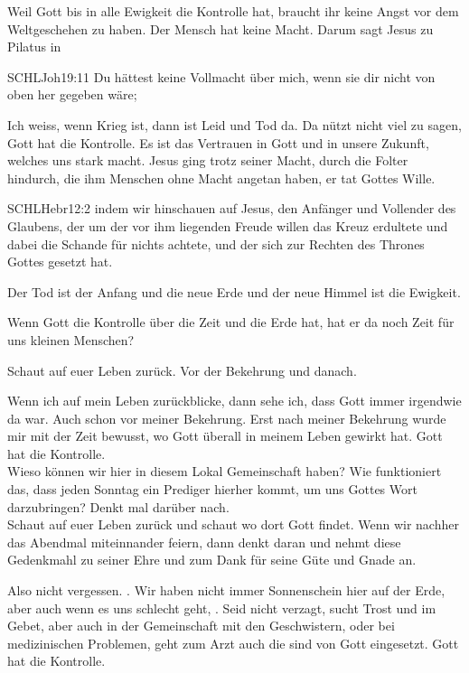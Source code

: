 \begin{otsblock}
        Weil Gott bis in alle Ewigkeit die Kontrolle hat, braucht ihr keine Angst vor dem Weltgeschehen zu haben. Der Mensch hat keine Macht. Darum sagt Jesus zu Pilatus in
        \begin{bibelbox}{SCHL}{Joh}{19:11}
            Du hättest keine Vollmacht über mich, wenn sie dir nicht von oben her gegeben wäre;
        \end{bibelbox}
        Ich weiss, wenn Krieg ist, dann ist Leid und Tod da. Da nützt nicht viel zu sagen, Gott hat die Kontrolle. Es ist das Vertrauen in Gott und in unsere Zukunft, welches uns stark macht. Jesus ging trotz seiner Macht, durch die Folter hindurch, die ihm Menschen ohne Macht angetan haben, er tat Gottes Wille. 
        \begin{bibelbox}{SCHL}{Hebr}{12:2}
        indem wir hinschauen auf Jesus, den Anfänger und Vollender des Glaubens, der um der vor ihm liegenden Freude willen das Kreuz erdultete und dabei die Schande für nichts achtete, und der sich zur Rechten des Thrones Gottes gesetzt hat.
        \end{bibelbox}
        Der Tod ist der Anfang und die neue Erde und der neue Himmel ist die Ewigkeit.  
        
        Wenn Gott die Kontrolle über die Zeit und die Erde hat, hat er da noch Zeit für uns kleinen Menschen?

        Schaut auf euer Leben zurück. Vor der Bekehrung und danach.
        
        Wenn ich auf mein Leben zurückblicke, dann sehe ich, dass Gott immer irgendwie da war. Auch schon vor meiner Bekehrung. Erst nach meiner Bekehrung wurde mir mit der Zeit bewusst, wo Gott überall in meinem Leben gewirkt hat. Gott hat die Kontrolle. 
        \\ Wieso können wir hier in diesem Lokal Gemeinschaft haben? Wie funktioniert das, dass jeden Sonntag ein Prediger hierher kommt, um uns Gottes Wort darzubringen? Denkt mal darüber nach.
        \\ Schaut auf euer Leben zurück und schaut wo  dort Gott findet. Wenn wir nachher das Abendmal miteinnander feiern, dann denkt daran und nehmt diese Gedenkmahl zu seiner Ehre und zum Dank für seine Güte und Gnade an.

        Also nicht vergessen. . Wir haben nicht immer Sonnenschein hier auf der Erde, aber auch wenn es uns schlecht geht, . Seid nicht verzagt, sucht Trost und  im Gebet, aber auch in der Gemeinschaft mit den Geschwistern, oder bei medizinischen Problemen, geht zum Arzt auch die sind von Gott eingesetzt. Gott hat die Kontrolle.      
    \end{otsblock}

